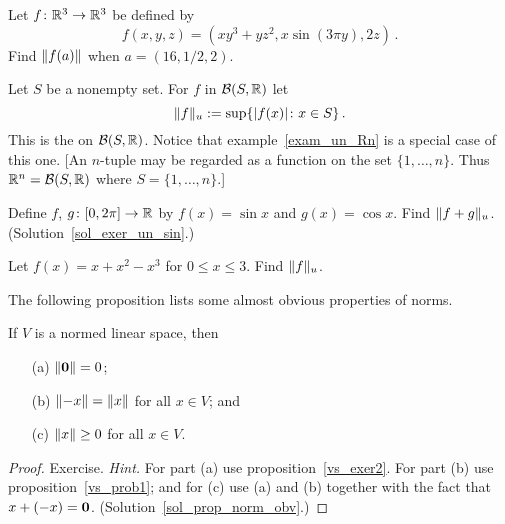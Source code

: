 \begin{prob} Let $f \colon \mathbb{R}^3 \rightarrow \mathbb{R}^3$ be defined by
  \[ f(x,y,z) = (xy^3 + yz^2, x\sin(3\pi y), 2z)\,. \]
Find $\lVert f(a)\rVert$ when $a = (16,1/2,2)$.
\end{prob}

\begin{exam}\label{exam_un_set}  Let $S$ be a nonempty set.  For $f$ in $\mathcal{B}(S,\mathbb{R})$ let
  \[ \lVert f\rVert_u := \sup\{\lvert f(x)\rvert \colon x \in S\}\,. \]
This is the
 on $\mathcal{B}(S,\mathbb{R})$. Notice that example~\ref{exam_un_Rn} is a special case of
this one.  [An $n$-tuple may be regarded as a function on the set $\{1,\dots,n\}$. Thus $\mathbb{R}^n
= \mathcal{B}(S,\mathbb{R})$ where $S = \{1,\dots, n\}$.]
\end{exam}

\begin{exer}\label{exer_un_sin}  Define $f$, $g \colon [0, 2\pi] \rightarrow \mathbb{R}$ by $f(x) = \sin x$ and
$g(x) = \cos x$. Find $\lVert f + g\rVert_u$.   (Solution~\ref{sol_exer_un_sin}.)
\end{exer}

\begin{prob} Let $f(x) = x + x^2 - x^3$ for $0 \le x \le 3$.  Find $\lVert f\rVert_u$.
\end{prob}

The following proposition lists some almost obvious properties of norms.

\begin{prop}\label{prop_norm_obv} If $V$ is a normed linear space, then
 \begin{enumerate}
  \item[(a)] $\lVert\mathbf{0}\rVert  =  0$;
  \item[(b)] $\lVert-x\rVert = \lVert x\rVert$ for all $x \in V$; and
  \item[(c)] $\lVert x\rVert \ge 0$ for all $x \in V$.
 \end{enumerate}
\end{prop}

\begin{proof}  Exercise. \emph{Hint.} For part (a) use proposition~\ref{vs_exer2}.  For part (b) use
proposition~\ref{vs_prob1}; and for (c) use (a) and (b) together with the fact that $x + (-x)
= \mathbf{0}$.  (Solution~\ref{sol_prop_norm_obv}.) \ns
\end{proof}







